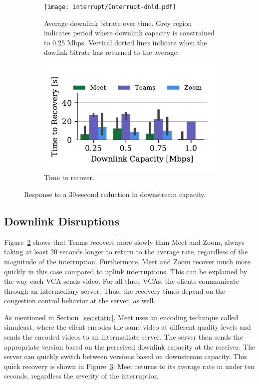 \begin{figure}[t!]
 \centering
\begin{subfigure}[t]{.5\textwidth}
   \centering
    \texttt{[image: interrupt/Interrupt-dnld.pdf]}
    \caption{Average downlink bitrate over time. Grey region indicates period where downlink capacity is constrained to 0.25 Mbps. Vertical dotted lines indicate when the dowlink bitrate has returned to the average.}
    \label{fig:ts-dnld}
\end{subfigure}
\begin{subfigure}[t]{.5\textwidth}
  \centering
    \includegraphics[width=.7\textwidth,keepaspectratio]{figures/interrupt/TTR-dnld.pdf}
    \caption{Time to recover.}
    \label{fig:TTR_dnld}
\end{subfigure}
\caption{Response to a 30-second reduction in downstream capacity.}
\label{fig:interrupt-dnld}
\end{figure}

\subsection{Downlink Disruptions}

Figure~\ref{fig:TTR_dnld} shows that Teams recovers more slowly than Meet and
Zoom, always taking at least 20 seconds longer to return to the average rate,
regardless of the magnitude of the interruption. Furthermore, Meet and Zoom
recover much more quickly in this case compared to uplink interruptions. This
can be explained by the way each VCA sends video. For all three VCAs, the
clients communicate through an intermediary server. Thus, the recovery times
depend on the congestion control behavior at the server, as well. 

As mentioned in Section~\ref{sec:static}, Meet uses an encoding technique
called simulcast, where the client encodes the same video at different quality
levels and sends the encoded videos to an intermediate server. The server then
sends the appropriate version based on the perceived downlink capacity at the
receiver. The server can quickly switch between versions based on downstream
capacity. This quick recovery is shown in
Figure~\ref{fig:interrupt-dnld}: Meet returns to its average rate in under ten
seconds, regardless the severity of the interruption.

